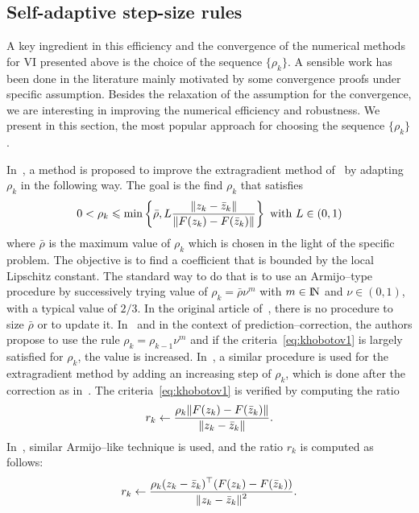 {\subsection{Self-adaptive step-size rules}
\label{sec:numericalmethods,vi,adaptive}

A key ingredient in this efficiency and the convergence of the numerical methods for VI presented above is the choice of the sequence $\{\rho_k\}$. A sensible work has been done in the literature mainly motivated by some convergence proofs under specific assumption. Besides the relaxation of the assumption for the convergence, we are interesting in improving the numerical efficiency and robustness. We present in this section, the most popular approach for choosing the sequence $\{\rho_k\}$.

In~\citep{Khobotov_CMMP1987}, a method is proposed to improve the extragradient method of~\citet{Korpelevich1976} by adapting $\rho_k$ in the following way.
The goal is the find $\rho_k$ that satisfies
  \begin{equation}
    \label{eq:khobotov1}
    0 < \rho_k \leq \min\left\{\bar\rho,L \Frac{\|z_k-\bar z_k\|}{\|F(z_k)-F(\bar z_k)\|}\right\}\text{ with } L \in (0,1)
  \end{equation}
where $\bar \rho$ is the maximum value of $\rho_k$ which is chosen in the light of the specific problem.
The {objective} is to find a coefficient that is bounded by the local Lipschitz constant. The standard way to do that is to use an Armijo--type procedure by successively trying value of $\rho_k = \bar \rho \nu^m$ with $m\in\mathrm{I\!N}$ and $\nu\in (0,1)$, with a typical value of $2/3$.  In the original article of~\cite{Khobotov_CMMP1987}, there is no procedure to size $\bar \rho$ or to update it. In~\cite{He.Liao_JOTA2002} and in the context of prediction--correction, the authors propose to use the rule $\rho_k =  \rho_{k-1} \nu^m$ and  if the criteria~\eqref{eq:khobotov1} is largely satisfied for $\rho_{k}$, the value is increased.
In~\citep{Han.Lo_CMA2002},  a similar procedure is used for the extragradient method by adding an increasing step of $\rho_k$, which is done after the correction as in~\cite{He.Liao_JOTA2002}. The criteria~\eqref{eq:khobotov1} is  verified by computing the ratio
\begin{equation}
  \label{eq:Khobotov-r}
  r _{k} \leftarrow \Frac{\rho_k \|F(z_k)-F(\bar z_k)\|}{ \|z_k-\bar z_k\| }.
\end{equation}
 In~\citep{Solodov.Tseng1996}, similar Armijo--like technique is used, and the ratio $r_k$ is computed as follows:
\begin{equation}
  \label{eq:SolodovTseng-r}
  r _{k} \leftarrow \Frac{\rho_k(z_k-\bar z_k)^\top(F(z_k)-F(\bar z_k))}{ \|z_k-\bar z_k\|^2 }.
\end{equation}




}
